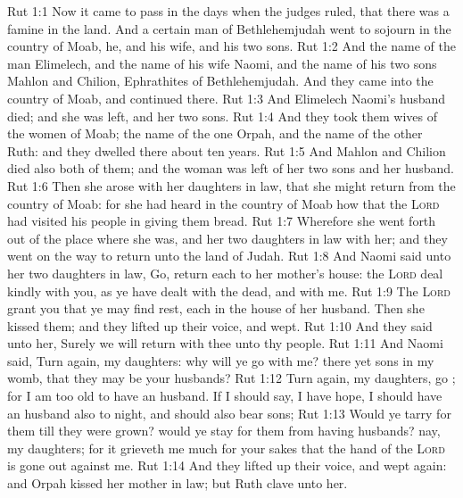 \vs Rut 1:1 Now it came to pass in the days when the judges ruled, that there was a famine in the land. And a certain man of Bethlehemjudah went to sojourn in the country of Moab, he, and his wife, and his two sons.
\vs Rut 1:2 And the name of the man  Elimelech, and the name of his wife Naomi, and the name of his two sons Mahlon and Chilion, Ephrathites of Bethlehemjudah. And they came into the country of Moab, and continued there.
\vs Rut 1:3 And Elimelech Naomi's husband died; and she was left, and her two sons.
\vs Rut 1:4 And they took them wives of the women of Moab; the name of the one  Orpah, and the name of the other Ruth: and they dwelled there about ten years.
\vs Rut 1:5 And Mahlon and Chilion died also both of them; and the woman was left of her two sons and her husband.
\vs Rut 1:6 Then she arose with her daughters in law, that she might return from the country of Moab: for she had heard in the country of Moab how that the \textsc{Lord} had visited his people in giving them bread.
\vs Rut 1:7 Wherefore she went forth out of the place where she was, and her two daughters in law with her; and they went on the way to return unto the land of Judah.
\vs Rut 1:8 And Naomi said unto her two daughters in law, Go, return each to her mother's house: the \textsc{Lord} deal kindly with you, as ye have dealt with the dead, and with me.
\vs Rut 1:9 The \textsc{Lord} grant you that ye may find rest, each  in the house of her husband. Then she kissed them; and they lifted up their voice, and wept.
\vs Rut 1:10 And they said unto her, Surely we will return with thee unto thy people.
\vs Rut 1:11 And Naomi said, Turn again, my daughters: why will ye go with me?  there yet  sons in my womb, that they may be your husbands?
\vs Rut 1:12 Turn again, my daughters, go ; for I am too old to have an husband. If I should say, I have hope,  I should have an husband also to night, and should also bear sons;
\vs Rut 1:13 Would ye tarry for them till they were grown? would ye stay for them from having husbands? nay, my daughters; for it grieveth me much for your sakes that the hand of the \textsc{Lord} is gone out against me.
\vs Rut 1:14 And they lifted up their voice, and wept again: and Orpah kissed her mother in law; but Ruth clave unto her.
